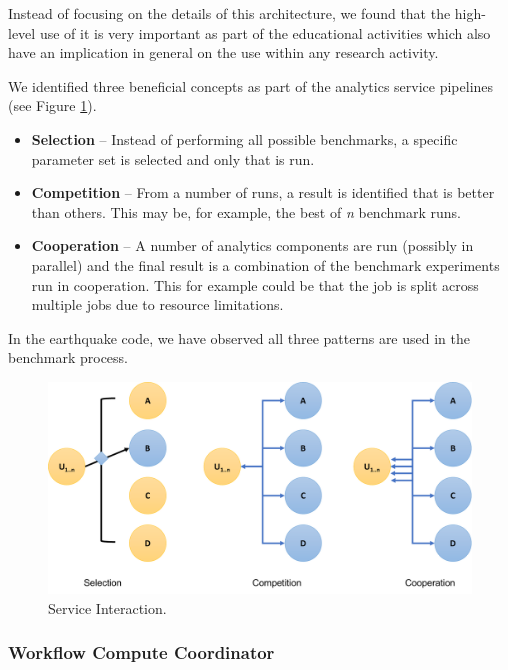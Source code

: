 \documentclass[utf8]{FrontiersinVancouver} %
\begin{document}
Instead of focusing on the details of this architecture, we found that the high-level use of it is very important as part of the educational activities which also have an implication in general on the use within any research activity.

We identified three beneficial concepts as part of the analytics service pipelines (see Figure \ref{fig:service-interaction}).

\begin{itemize}
\item {\bf Selection} -- Instead of performing all possible benchmarks,  a specific parameter set is selected and only that is run.  \item {\bf Competition} -- From a number of runs, a result is  identified that is better than others. This may be, for example, the  best of {\em n} benchmark runs.
\item {\bf Cooperation} -- A number of analytics components are run  (possibly in parallel) and the final result is a combination of the  benchmark experiments run in cooperation. This for example could be  that the job is split across multiple jobs due to resource  limitations.
\end{itemize}

In the earthquake code, we have observed all three patterns are used in the benchmark process.

\begin{figure}[htb]
\centering\includegraphics[width=0.75\columnwidth]{images/processes-nist}
\caption{Service Interaction.}
\label{fig:service-interaction}
\end{figure}




\subsubsection{Workflow Compute Coordinator}
\label{sec:workflow-cc}

\end{document}
